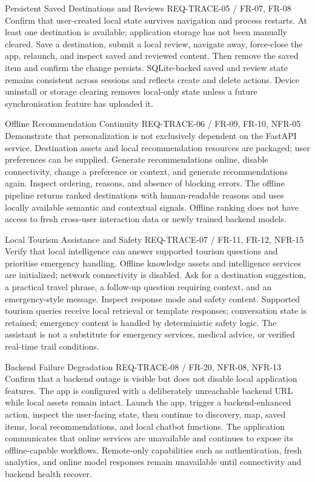 \EvidenceSheet
{Persistent Saved Destinations and Reviews}
{REQ-TRACE-05 / FR-07, FR-08}
{Confirm that user-created local state survives navigation and process restarts.}
{At least one destination is available; application storage has not been manually cleared.}
{Save a destination, submit a local review, navigate away, force-close the app, relaunch, and inspect saved and reviewed content. Then remove the saved item and confirm the change persists.}
{SQLite-backed saved and review state remains consistent across sessions and reflects create and delete actions.}
{Device uninstall or storage clearing removes local-only state unless a future synchronisation feature has uploaded it.}

\EvidenceSheet
{Offline Recommendation Continuity}
{REQ-TRACE-06 / FR-09, FR-10, NFR-05}
{Demonstrate that personalization is not exclusively dependent on the FastAPI service.}
{Destination assets and local recommendation resources are packaged; user preferences can be supplied.}
{Generate recommendations online, disable connectivity, change a preference or context, and generate recommendations again. Inspect ordering, reasons, and absence of blocking errors.}
{The offline pipeline returns ranked destinations with human-readable reasons and uses locally available semantic and contextual signals.}
{Offline ranking does not have access to fresh cross-user interaction data or newly trained backend models.}

\EvidenceSheet
{Local Tourism Assistance and Safety}
{REQ-TRACE-07 / FR-11, FR-12, NFR-15}
{Verify that local intelligence can answer supported tourism questions and prioritise emergency handling.}
{Offline knowledge assets and intelligence services are initialized; network connectivity is disabled.}
{Ask for a destination suggestion, a practical travel phrase, a follow-up question requiring context, and an emergency-style message. Inspect response mode and safety content.}
{Supported tourism queries receive local retrieval or template responses; conversation state is retained; emergency content is handled by deterministic safety logic.}
{The assistant is not a substitute for emergency services, medical advice, or verified real-time trail conditions.}

\EvidenceSheet
{Backend Failure Degradation}
{REQ-TRACE-08 / FR-20, NFR-08, NFR-13}
{Confirm that a backend outage is visible but does not disable local application features.}
{The app is configured with a deliberately unreachable backend URL while local assets remain intact.}
{Launch the app, trigger a backend-enhanced action, inspect the user-facing state, then continue to discovery, map, saved items, local recommendations, and local chatbot functions.}
{The application communicates that online services are unavailable and continues to expose its offline-capable workflows.}
{Remote-only capabilities such as authentication, fresh analytics, and online model responses remain unavailable until connectivity and backend health recover.}

